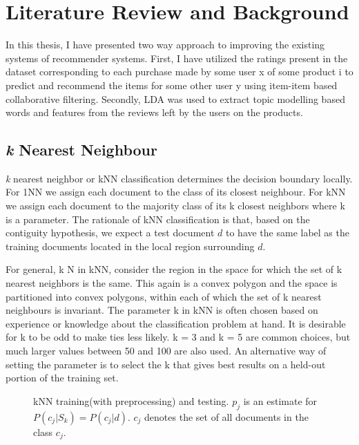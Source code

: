 \chapter{Literature Review and Background}
In this thesis, I have presented two way approach to improving the existing systems of recommender systems.
First, I have utilized the ratings present in the dataset corresponding to each purchase made by some user x of some product i to predict and recommend the items for some other user y using item-item based collaborative filtering. Secondly, LDA was used to extract topic modelling based words and features from the reviews left by the users on the products.

\section{\textit{k} Nearest Neighbour}
\textit{k} nearest neighbor or kNN classification determines the decision boundary locally. For 1NN we assign each document to the class of its closest neighbour. For kNN we assign each document to the majority class of its k closest neighbors where k is a parameter. The rationale of kNN classification is that, based on the contiguity hypothesis, we expect a test document $d$ to have the same label as the training documents located in the local region
surrounding $d$.

For general, k \in N in kNN, consider the region in the space for which the set of k nearest neighbors is the same. This again is a convex polygon and the space is partitioned into convex polygons, within each of which the set of k nearest neighbours is invariant.
The parameter k in kNN is often chosen based on experience or knowledge about the classification problem at hand.  It is desirable for k to be odd to make ties less likely. k = 3 and k = 5 are common choices, but much larger values between 50 and 100 are also used.  An alternative way of setting the parameter is to select the k that gives best results on a held-out portion of the training set.
\begin{figure}[H]
    {\par}
    \caption{kNN  training(with preprocessing) and testing. $p_{j}$ is an estimate for $P(c_{j}|S_{k}) = P(c_{j}|d)$. $c_{j}$ denotes the set of all documents in the class $c_{j}$.}
\end{figure}

